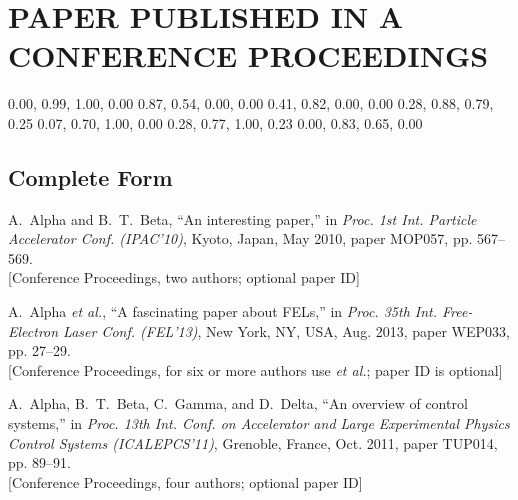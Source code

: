 \documentclass[letterpaper,  %
              ]{jacow-2_3}   %
\begin{document}
{{\patchcmd{}
\section{PAPER PUBLISHED IN A CONFERENCE PROCEEDINGS}

\definecolor{jred}{cmyk}  {0.00, 0.99, 1.00, 0.00}
\definecolor{jblue}{cmyk} {0.87, 0.54, 0.00, 0.00}
\definecolor{jvio}{cmyk}  {0.41, 0.82, 0.00, 0.00}
\definecolor{jbook}{cmyk} {0.28, 0.88, 0.79, 0.25}
\definecolor{jrept}{cmyk} {0.07, 0.70, 1.00, 0.00}
\definecolor{jmanu}{cmyk} {0.28, 0.77, 1.00, 0.23}
\definecolor{junpu}{cmyk} {0.00, 0.83, 0.65, 0.00}


\subsection{Complete Form}

\begin{thebibliography}{9} %
	
	A.~Alpha and B.~T.~Beta, “An interesting paper,”
	in \textit{Proc. 1st Int. Particle Accelerator Conf. (IPAC’10)}, 
	Kyoto, Japan, May 2010, 
	paper MOP057, pp. 567--569.\\
	\textcolor{jgreen}{[Conference Proceedings, two authors; optional paper ID]}

	A.~Alpha \emph{et al.}, 
	“A fascinating paper about FELs,”
	in \emph{Proc. 35th Int. Free-Electron Laser Conf. (FEL’13)}, 
	New York, NY, USA, Aug. 2013, 
	paper WEP033, pp. 27--29.\\
	\textcolor{jgreen}{[Conference Proceedings, for six or more authors use \emph{et al.};	
		paper ID is optional]}
	
	A.~Alpha, B.~T.~Beta, C.~Gamma, and D.~Delta, 
	“An overview of control systems,”
	in \emph{Proc. 13th Int. Conf. on Accelerator and Large Experimental Physics Control Systems (ICALEPCS’11)}, Grenoble, France, Oct. 2011, 
	paper TUP014, pp. 89--91.\\
	\textcolor{jgreen}{[Conference Proceedings, four authors; optional paper ID]}
\end{thebibliography}

}}
\end{document}
